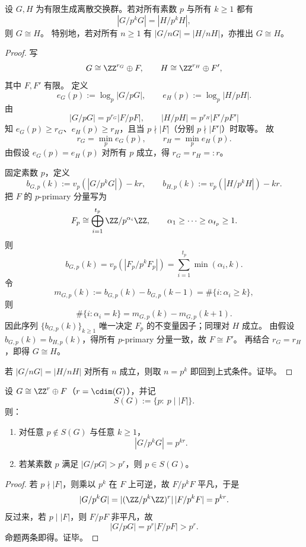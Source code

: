 \begin{theorem}\label{thm:xi-cdim-prime-ledger-complete-reconstruction}
设 \(G,H\) 为有限生成离散交换群。若对所有素数 \(p\) 与所有 \(k\ge 1\) 都有
\[
|G/p^kG|=|H/p^kH|,
\]
则 \(G\cong H\)。
特别地，若对所有 \(n\ge 1\) 有 \(|G/nG|=|H/nH|\)，亦推出 \(G\cong H\)。
\end{theorem}
\begin{proof}
写
\[
G\cong \ZZ^{r_G}\oplus F,\qquad H\cong \ZZ^{r_H}\oplus F',
\]
其中 \(F,F'\) 有限。
定义
\[
e_G(p):=\log_p|G/pG|,\qquad e_H(p):=\log_p|H/pH|.
\]
由
\[
|G/pG|=p^{r_G}|F/pF|,\qquad |H/pH|=p^{r_H}|F'/pF'|
\]
知 \(e_G(p)\ge r_G\)、\(e_H(p)\ge r_H\)，且当 \(p\nmid |F|\)（分别 \(p\nmid |F'|\)）时取等。
故
\[
r_G=\min_p e_G(p),\qquad r_H=\min_p e_H(p).
\]
由假设 \(e_G(p)=e_H(p)\) 对所有 \(p\) 成立，得 \(r_G=r_H=:r\)。

固定素数 \(p\)，定义
\[
b_{G,p}(k):=v_p(|G/p^kG|)-kr,\qquad
b_{H,p}(k):=v_p(|H/p^kH|)-kr.
\]
把 \(F\) 的 \(p\)-primary 分量写为
\[
F_p\cong \bigoplus_{i=1}^{t_p}\ZZ/p^{\alpha_i}\ZZ,\qquad
\alpha_1\ge\cdots\ge\alpha_{t_p}\ge 1.
\]
则
\[
b_{G,p}(k)=v_p(|F_p/p^kF_p|)=\sum_{i=1}^{t_p}\min(\alpha_i,k).
\]
令
\[
m_{G,p}(k):=b_{G,p}(k)-b_{G,p}(k-1)=\#\{i:\alpha_i\ge k\},
\]
则
\[
\#\{i:\alpha_i=k\}=m_{G,p}(k)-m_{G,p}(k+1).
\]
因此序列 \(\{b_{G,p}(k)\}_{k\ge 1}\) 唯一决定 \(F_p\) 的不变量因子；同理对 \(H\) 成立。
由假设 \(b_{G,p}(k)=b_{H,p}(k)\)，得所有 \(p\)-primary 分量一致，故 \(F\cong F'\)。
再结合 \(r_G=r_H\)，即得 \(G\cong H\)。

若 \(|G/nG|=|H/nH|\) 对所有 \(n\) 成立，则取 \(n=p^k\) 即回到上式条件。证毕。
\end{proof}

\begin{proposition}\label{prop:xi-cdim-good-prime-readout-and-bad-support}
设 \(G\cong \ZZ^r\oplus F\)（\(r=\cdim(G)\)），并记
\[
S(G):=\{p:\ p\mid |F|\}.
\]
则：
\begin{enumerate}
  \item 对任意 \(p\notin S(G)\) 与任意 \(k\ge 1\)，
  \[
  |G/p^kG|=p^{kr}.
  \]
  \item 若某素数 \(p\) 满足 \(|G/pG|>p^r\)，则 \(p\in S(G)\)。
\end{enumerate}
\end{proposition}
\begin{proof}
若 \(p\nmid |F|\)，则乘以 \(p^k\) 在 \(F\) 上可逆，故 \(F/p^kF\) 平凡，于是
\[
|G/p^kG|=|(\ZZ/p^k\ZZ)^r|\,|F/p^kF|=p^{kr}.
\]
反过来，若 \(p\mid |F|\)，则 \(F/pF\) 非平凡，故
\[
|G/pG|=p^r|F/pF|>p^r.
\]
命题两条即得。证毕。
\end{proof}

